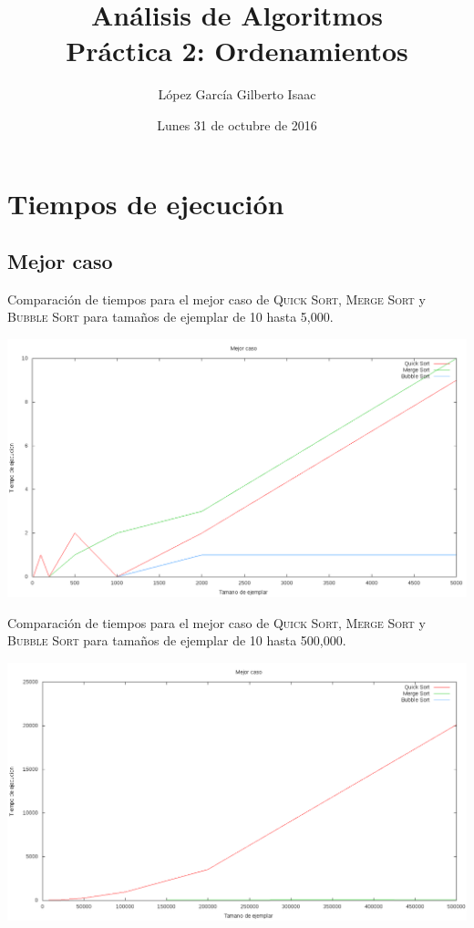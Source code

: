 \documentclass[spanish,12pt,letterpaper]{article}
\title{Análisis de Algoritmos\\ Práctica 2: Ordenamientos}
\author{López García Gilberto Isaac}
\affil{Facultad de Ciencias, UNAM}
\date{Lunes 31 de octubre de 2016}
\begin{document}
\maketitle

\section{Tiempos de ejecución}

\subsection{Mejor caso}

Comparación de tiempos para el mejor caso de \textsc{Quick Sort}, \textsc{Merge Sort} y \textsc{Bubble Sort} para tamaños de ejemplar de 10 hasta 5,000.

{
\includegraphics[scale=0.5]{mejorcaso_5m}
\centering
}

\newpage
Comparación de tiempos para el mejor caso de \textsc{Quick Sort}, \textsc{Merge Sort} y \textsc{Bubble Sort} para tamaños de ejemplar de 10 hasta 500,000.

{
\includegraphics[scale=0.5]{mejorcaso_500m}
\centering
}
\end{document}
